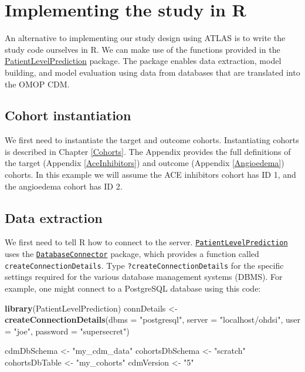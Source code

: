 \documentclass[11pt]{book}
\newenvironment{Shaded}{\begin{snugshade}}{\end{snugshade}}
\newcommand{\DataTypeTok}[1]{\textcolor[rgb]{0.13,0.29,0.53}{#1}}
\newcommand{\KeywordTok}[1]{\textcolor[rgb]{0.13,0.29,0.53}{\textbf{#1}}}
\newcommand{\NormalTok}[1]{#1}
\newcommand{\StringTok}[1]{\textcolor[rgb]{0.31,0.60,0.02}{#1}}
\theoremstyle{definition}
\theoremstyle{definition}
\theoremstyle{definition}
\theoremstyle{remark}
\begin{document}
\hypertarget{implementing-the-study-in-r}{%
\section{Implementing the study in R}\label{implementing-the-study-in-r}}

An alternative to implementing our study design using ATLAS is to write the study code ourselves in R. We can make use of the functions provided in the \href{https://ohdsi.github.io/PatientLevelPrediction/}{PatientLevelPrediction} package. The package enables data extraction, model building, and model evaluation using data from databases that are translated into the OMOP CDM.

\hypertarget{cohort-instantiation-2}{%
\subsection{Cohort instantiation}\label{cohort-instantiation-2}}

We first need to instantiate the target and outcome cohorts. Instantiating cohorts is described in Chapter \ref{Cohorts}. The Appendix provides the full definitions of the target (Appendix \ref{AceInhibitors}) and outcome (Appendix \ref{Angioedema}) cohorts. In this example we will assume the ACE inhibitors cohort has ID 1, and the angioedema cohort has ID 2.

\hypertarget{data-extraction-3}{%
\subsection{Data extraction}\label{data-extraction-3}}

We first need to tell R how to connect to the server. \href{https://ohdsi.github.io/PatientLevelPrediction/}{\texttt{PatientLevelPrediction}} uses the \href{https://ohdsi.github.io/DatabaseConnector/}{\texttt{DatabaseConnector}} package, which provides a function called \texttt{createConnectionDetails}. Type \texttt{?createConnectionDetails} for the specific settings required for the various database management systems (DBMS). For example, one might connect to a PostgreSQL database using this code:

\begin{Shaded}
\begin{Highlighting}[]
\KeywordTok{library}\NormalTok{(PatientLevelPrediction)}
\NormalTok{connDetails <-}\StringTok{ }\KeywordTok{createConnectionDetails}\NormalTok{(}\DataTypeTok{dbms =} \StringTok{"postgresql"}\NormalTok{,}
                                       \DataTypeTok{server =} \StringTok{"localhost/ohdsi"}\NormalTok{,}
                                       \DataTypeTok{user =} \StringTok{"joe"}\NormalTok{,}
                                       \DataTypeTok{password =} \StringTok{"supersecret"}\NormalTok{)}

\NormalTok{cdmDbSchema <-}\StringTok{ "my_cdm_data"}
\NormalTok{cohortsDbSchema <-}\StringTok{ "scratch"}
\NormalTok{cohortsDbTable <-}\StringTok{ "my_cohorts"}
\NormalTok{cdmVersion <-}\StringTok{ "5"}
\end{Highlighting}
\end{Shaded}
\end{document}

